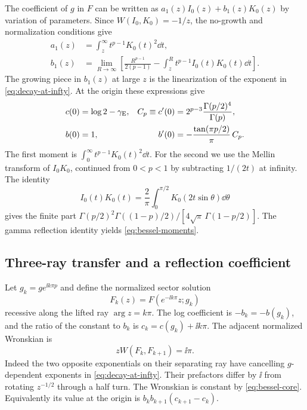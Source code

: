 The coefficient of \(g\) in \(F\) can be written as \(a_1(z)I_0(z)+b_1(z)K_0(z)\) by variation of parameters. Since \(W(I_0,K_0)=-1/z\), the no-growth and normalization conditions give
\begin{align}
 a_1(z)&=\int_z^\infty t^{p-1}K_0(t)^2\dd t,\\
 b_1(z)&=\lim_{R\to\infty}\left[
       \frac{R^{p-1}}{2(p-1)}
      -\int_z^R t^{p-1}I_0(t)K_0(t)\dd t\right].
\end{align}
The growing piece in \(b_1(z)\) at large \(z\) is the linearization of the exponent in \eqref{eq:decay-at-infty}. At the origin these expressions give
\begin{align}
 c(0)&=\log 2-\gamma_{\rm E},&
 C_p\equiv c'(0)&=2^{p-3}\frac{\Gamma(p/2)^4}{\Gamma(p)},\\
 b(0)&=1,&
 b'(0)&=-\frac{\tan(\pi p/2)}{\pi}\,C_p.
 \label{eq:bessel-moments}
\end{align}
The first moment is \(\int_0^\infty t^{p-1}K_0(t)^2\dd t\). For the second we use the Mellin transform of \(I_0K_0\), continued from \(0<p<1\) by subtracting \(1/(2t)\) at infinity. The identity
\begin{equation}
 I_0(t)K_0(t)=\frac{2}{\pi}\int_0^{\pi/2}K_0(2t\sin\theta)\dd\theta
\end{equation}
gives the finite part \(\Gamma(p/2)^2\Gamma((1-p)/2)/[4\sqrt{\pi}\,\Gamma(1-p/2)]\). The gamma reflection identity yields \eqref{eq:bessel-moments}.

\subsection{Three-ray transfer and a reflection coefficient}

Let \(g_k=g e^{\ii k\pi p}\) and define the normalized sector solution
\begin{equation}
 F_k(z)=F(e^{-\ii k\pi}z;g_k)
\end{equation}
recessive along the lifted ray \(\arg z=k\pi\). The log coefficient is \(-b_k=-b(g_k)\), and the ratio of the constant to \(b_k\) is \(c_k=c(g_k)+\ii k\pi\). The adjacent normalized Wronskian is
\begin{equation}
 zW(F_k,F_{k+1})=\ii\pi .
 \label{eq:adjacent-wronskian}
\end{equation}
Indeed the two opposite exponentials on their separating ray have cancelling \(g\)-dependent exponents in \eqref{eq:decay-at-infty}. Their prefactors differ by \(\ii\) from rotating \(z^{-1/2}\) through a half turn. The Wronskian is constant by \eqref{eq:bessel-core}. Equivalently its value at the origin is \(b_k b_{k+1}(c_{k+1}-c_k)\).

